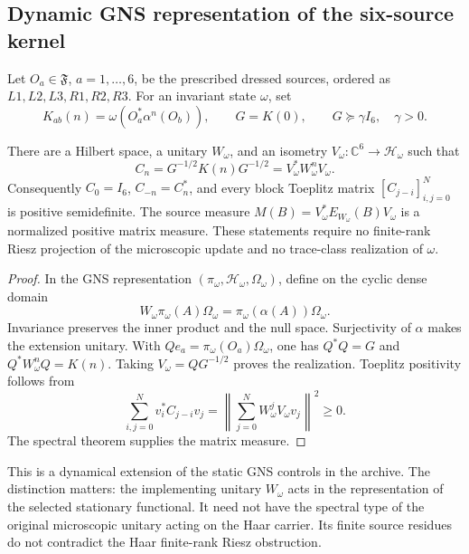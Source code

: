 \subsection{Dynamic GNS representation of the six-source kernel}

Let $O_a\in\mathfrak F$, $a=1,\ldots,6$, be the prescribed dressed sources,
ordered as $L1,L2,L3,R1,R2,R3$. For an invariant state $\omega$, set
\begin{equation}
 K_{ab}(n)=\omega(O_a^*\alpha^n(O_b)),\qquad
 G=K(0),\qquad G\succeq\gamma I_6,\quad\gamma>0.
 \label{eq:algebraic-raw-kernel}
\end{equation}

\begin{theorem}
\label{thm:algebraic-source-realization}
There are a Hilbert space, a unitary $W_\omega$, and an isometry
$V_\omega:\mathbb C^6\to\mathcal H_\omega$ such that
\begin{equation}
 C_n=G^{-1/2}K(n)G^{-1/2}
     =V_\omega^*W_\omega^nV_\omega.
 \label{eq:algebraic-normalized-moments}
\end{equation}
Consequently $C_0=I_6$, $C_{-n}=C_n^*$, and every block Toeplitz matrix
$[C_{j-i}]_{i,j=0}^N$ is positive semidefinite. The source measure
$M(B)=V_\omega^*E_{W_\omega}(B)V_\omega$ is a normalized positive matrix
measure. These statements require no finite-rank Riesz projection of the
microscopic update and no trace-class realization of $\omega$.
\end{theorem}
\begin{proof}
In the GNS representation $(\pi_\omega,\mathcal H_\omega,\Omega_\omega)$,
define on the cyclic dense domain
\[
 W_\omega\pi_\omega(A)\Omega_\omega
     =\pi_\omega(\alpha(A))\Omega_\omega.
\]
Invariance preserves the inner product and the null space. Surjectivity of
$\alpha$ makes the extension unitary. With
$Qe_a=\pi_\omega(O_a)\Omega_\omega$, one has $Q^*Q=G$ and
$Q^*W_\omega^nQ=K(n)$. Taking $V_\omega=QG^{-1/2}$ proves the realization.
Toeplitz positivity follows from
\[
 \sum_{i,j=0}^N v_i^*C_{j-i}v_j
 =\left\|\sum_{j=0}^N W_\omega^jV_\omega v_j\right\|^2\geq0.
\]
The spectral theorem supplies the matrix measure.
\end{proof}

This is a dynamical extension of the static GNS controls in the archive.
The distinction matters: the implementing unitary $W_\omega$ acts in the
representation of the selected stationary functional. It need not have the
spectral type of the original microscopic unitary acting on the Haar carrier.
Its finite source residues do not contradict the Haar finite-rank Riesz
obstruction.

